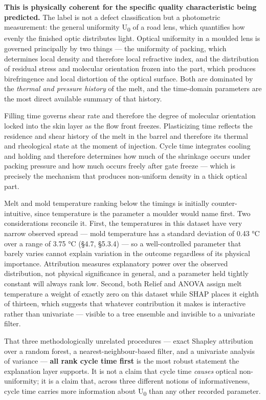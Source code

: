 \textbf{This is physically coherent for the specific quality characteristic being predicted.} The label is not a defect classification but a photometric measurement: the general uniformity U\textsubscript{0} of a road lens, which quantifies how evenly the finished optic distributes light. Optical uniformity in a moulded lens is governed principally by two things --- the uniformity of packing, which determines local density and therefore local refractive index, and the distribution of residual stress and molecular orientation frozen into the part, which produces birefringence and local distortion of the optical surface. Both are dominated by the \emph{thermal and pressure history} of the melt, and the time-domain parameters are the most direct available summary of that history.

Filling time governs shear rate and therefore the degree of molecular orientation locked into the skin layer as the flow front freezes. Plasticizing time reflects the residence and shear history of the melt in the barrel and therefore its thermal and rheological state at the moment of injection. Cycle time integrates cooling and holding and therefore determines how much of the shrinkage occurs under packing pressure and how much occurs freely after gate freeze --- which is precisely the mechanism that produces non-uniform density in a thick optical part.

Melt and mold temperature ranking below the timings is initially counter-intuitive, since temperature is the parameter a moulder would name first. Two considerations reconcile it. First, the temperatures in this dataset have very narrow observed spread --- mold temperature has a standard deviation of 0.43 °C over a range of 3.75 °C (§4.7, §5.3.4) --- so a well-controlled parameter that barely varies cannot explain variation in the outcome regardless of its physical importance. Attribution measures explanatory power over the observed distribution, not physical significance in general, and a parameter held tightly constant will always rank low. Second, both Relief and ANOVA assign melt temperature a weight of exactly zero on this dataset while SHAP places it eighth of thirteen, which suggests that whatever contribution it makes is interactive rather than univariate --- visible to a tree ensemble and invisible to a univariate filter.

That three methodologically unrelated procedures --- exact Shapley attribution over a random forest, a nearest-neighbour-based filter, and a univariate analysis of variance --- \textbf{all rank cycle time first} is the most robust statement the explanation layer supports. It is not a claim that cycle time \emph{causes} optical non-uniformity; it is a claim that, across three different notions of informativeness, cycle time carries more information about U\textsubscript{0} than any other recorded parameter.

